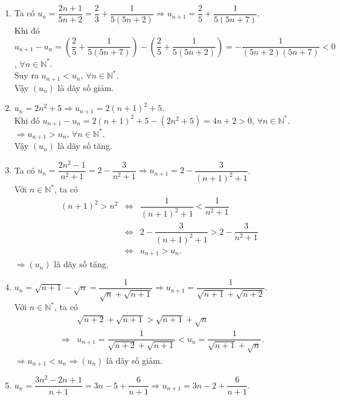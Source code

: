 \begin{ex}
{\begin{enumerate}
\begin{eqnarray*}
				 &=&\dfrac{2}{(n+1)(n+2)}>0.
			\end{eqnarray*}
			Suy ra $u_{n+1}>u_n$, $\forall n\in\mathbb{N}^*$.\\ 
			Vậy dãy số $\left(u_n\right)$ là dãy  số tăng.
			\item Ta có $u_n=\dfrac{2  n+1}{5 n+2}=\dfrac{2}{3}+\dfrac{1}{5(5 n+2)} \Rightarrow u_{n+1}=\dfrac{2}{5}+\dfrac{1}{5(5 n+7)}$.\\
			Khi đó $u_{n+1}-u_n=\left(\dfrac{2}{5}+\dfrac{1}{5(5 n+7)}\right)-\left(\dfrac{2}{5}+\dfrac{1}{5(5 n+2)}\right)=-\dfrac{1}{(5 n+2)(5 n+7)}<0$, $\forall n\in\mathbb{N}^*$.\\ 
			Suy ra $u_{n+1}<u_n$, $\forall  n\in\mathbb{N}^*$.\\
			Vậy $\left(u_n\right)$ là dãy số  giảm.
			\item  $u_n=2 n^2+5 \Rightarrow u_{n+1}=2(n+1)^2+5$.\\
			Khi đó  $u_{n+1}-u_n=2(n+1)^2+5-\left(2 n^2+5\right)=4 n+2>0$, $\forall n\in\mathbb{N}^*$.\\
			$\Rightarrow u_{n+1}>u_n$, $\forall n\in\mathbb{N}^*$.\\ Vậy $\left(u_n\right)$ là dãy  số tăng.
			 \item Ta có $u_n=\dfrac{2 n^2-1}{n^2+1}=2-\dfrac{3}{n^2+1} \Rightarrow u_{n+1}=2-\dfrac{3}{(n+1)^2+1}$.\\
			Với $n \in \mathbb{N}^*$,  ta có
			 \allowdisplaybreaks
			\begin{eqnarray*}
				(n+1)^2>n^2 &\Leftrightarrow&  \dfrac{1}{(n+1)^2+1}<\dfrac{1}{n^2+1} \\
				&\Leftrightarrow& 2-\dfrac{3}{(n+1)^2+1}>2-\dfrac{3}{n^2+1}\\ &\Leftrightarrow& u_{n+1}>u_n. 
			\end{eqnarray*}
			$\Rightarrow\left(u_n\right)$ là dãy số tăng. 
			\item $u_n=\sqrt{n+1}-\sqrt{n}=\dfrac{1}{\sqrt{n}+\sqrt{n+1}} \Rightarrow u_{n+1}=\dfrac{1}{\sqrt{n+1}+\sqrt{n+2}}$.\\ 
			Với $n \in \mathbb{N}^*$, ta có 
			\allowdisplaybreaks 
			\begin{eqnarray*}
				&&\sqrt{n+2}+\sqrt{n+1}>\sqrt{n+1}+\sqrt{n}\\ 
				&\Rightarrow&  u_{n+1}=\dfrac{1}{\sqrt{n+2}+\sqrt{n+1}}<u_n=\dfrac{1}{\sqrt{n+1}+\sqrt{n}}.
			\end{eqnarray*}
			 $\Rightarrow u_{n+1}<u_n \Rightarrow\left(u_n\right)$ là dãy số giảm.
			\item $u_n=\dfrac{3 n^2-2 n+1}{n+1}=3 n-5+\dfrac{6}{n+1} \Rightarrow u_{n+1}=3 n-2+\dfrac{6}{n+1}$.\\ 

\end{enumerate}}
\end{ex}
